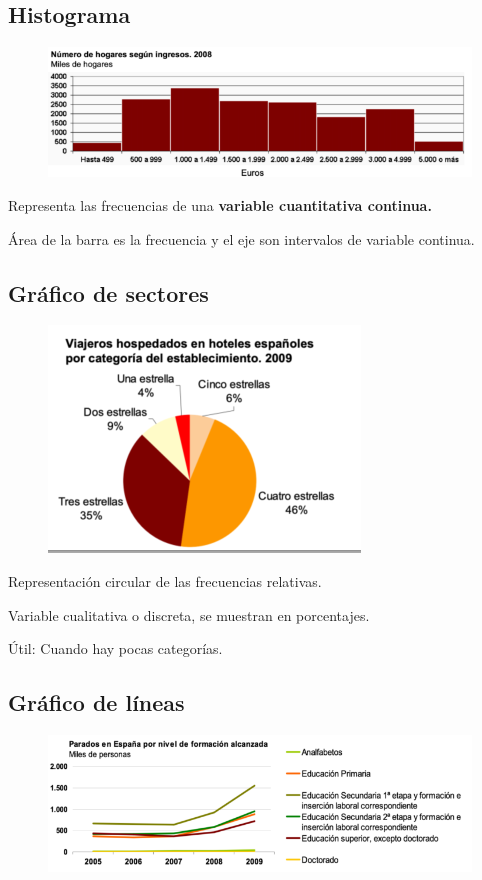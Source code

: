 \documentclass[12pt]{report} %
\begin{document}
\subsection{Histograma}

\begin{figure}[H]
	{\includegraphics[scale=.4]{Untitled 7.png}}
\end{figure}
Representa las frecuencias de una \textbf{variable cuantitativa
continua.}

Área de la barra es la frecuencia y el eje son intervalos de variable
continua.

\subsection{Gráfico de sectores}
\begin{figure}[H]
	{\includegraphics[scale=.5]{Untitled 8.png}}
\end{figure}

Representación circular de las frecuencias relativas.

Variable cualitativa o discreta, se muestran en porcentajes.

Útil: Cuando hay pocas categorías.

\subsection{Gráfico de líneas}
\begin{figure}[H]
	{\includegraphics[scale=.5]{Untitled 9.png}}
\end{figure}
\end{document}
